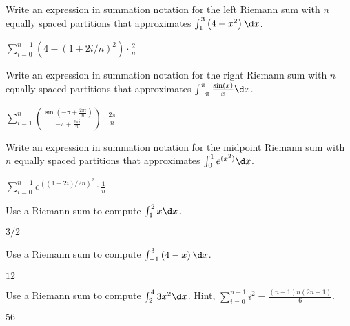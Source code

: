 \begin{exercises}
\begin{exercise}
Write an expression in summation notation for the left Riemann sum
with $n$ equally spaced partitions that approximates $\int_1^3 \left(4-x^2\right) \d x$.
\begin{answer}
$\sum_{i=0}^{n-1} \left( 4 - (1+2i/n)^2\right)\cdot \frac{2}{n}$
\end{answer}
\end{exercise}

\begin{exercise}
Write an expression in summation notation for the right Riemann sum
with $n$ equally spaced partitions that approximates $\int_{-\pi}^\pi
\frac{\sin(x)}{x} \d x$.
\begin{answer}
$\sum_{i=1}^{n} \left(\frac{\sin\left(-\pi + \frac{2\pi i}{n}\right)}{-\pi + \frac{2\pi i}{n}}\right)\cdot \frac{2\pi}{n}$
\end{answer}
\end{exercise}

\begin{exercise}
Write an expression in summation notation for the midpoint Riemann sum
with $n$ equally spaced partitions that approximates $\int_{0}^1 e^{(x^2)} \d x$.
\begin{answer}
$\sum_{i=0}^{n-1} e^{((1+2i)/2n)^2} \cdot \frac{1}{n}$
\end{answer}
\end{exercise}

\begin{exercise} 
Use a Riemann sum to compute $\int_1^2 x \d x$.
\begin{answer}
$3/2$
\end{answer}
\end{exercise}

\begin{exercise}
Use a Riemann sum to compute $\int_{-1}^3 \left(4-x\right) \d x$.
\begin{answer}
$12$
\end{answer}
\end{exercise}


\begin{exercise}
Use a Riemann sum to compute $\int_{2}^4 3x^2 \d x$. Hint,
$\sum_{i=0}^{n-1} i^2 = \frac{(n-1)n(2n-1)}{6}$.
\begin{answer}
$56$
\end{answer}
\end{exercise}



\end{exercises}

